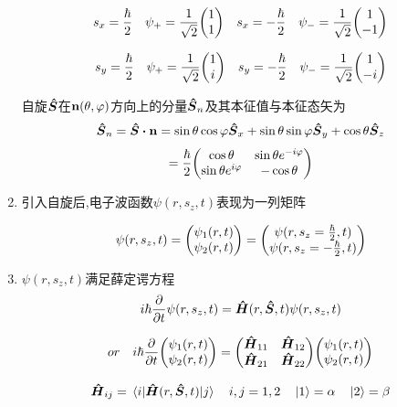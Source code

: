 \begin{formal}
\begin{enumerate}
                  $$ 
                  s_{x} = \frac{\hbar}{2} \quad \psi_{+} = \frac{1}{\sqrt{2}} \mqty(1 \\ 1) \quad 
                  s_{x} = -\frac{\hbar}{2} \quad \psi_{-} = \frac{1}{\sqrt{2}} \mqty(1 \\ -1)
                  $$

                  $$ 
                  s_{y} = \frac{\hbar}{2} \quad \psi_{+} = \frac{1}{\sqrt{2}} \mqty(1 \\ i) \quad 
                  s_{y} = -\frac{\hbar}{2} \quad \psi_{-} = \frac{1}{\sqrt{2}} \mqty(1 \\ -i)
                  $$

                  自旋$\vu*{S}$在$\vb{n}(\theta,\varphi)$方向上的分量$\vu*{S}_{n}$及其本征值与本征态矢为
                  $$ 
                  \vu*{S}_{n} = \vb{\vu*{S}} \vdot \vb{n} = 
                  \sin{\theta} \cos{\varphi} \vu*{S}_{x} + \sin{\theta}\sin{\varphi} \vu*{S}_{y} + \cos{\theta}\vu*{S}_{z}
                  $$
                  $$
                  = \frac{\hbar}{2} \mqty(\cos{\theta} & \sin{\theta}e^{-i\varphi} \\ \sin{\theta}e^{i\varphi} & -\cos{\theta}   )
                  $$

            \item 引入自旋后,电子波函数$\psi(r,s_{z},t)$表现为一列矩阵
            
                  $$ 
                  \psi(r,s_{z},t) = \mqty(\psi_{1}(r,t) \\ \psi_{2}(r,t) ) = 
                  \mqty(\psi(r,s_{z} = \frac{\hbar}{2},t) \\ \psi(r,s_{z} = -\frac{\hbar}{2},t) ) 
                  $$

            \item $\psi(r,s_{z},t)$满足薛定谔方程
                  $$ i\hbar\pdv{}{t} \psi(r,s_{z},t) = \vu*{H}(r,\vu*{S},t)\psi(r,s_{z},t) $$
                  
                  $$ 
                  or \quad i\hbar \pdv{t} \mqty(\psi_{1}(r,t) \\ \psi_{2}(r,t)) = 
                  \mqty(\vu*{H}_{11} & \vu*{H}_{12} \\ \vu*{H}_{21} & \vu*{H}_{22} ) \mqty(\psi_{1}(r,t) \\ \psi_{2}(r,t))
                  $$
                  
                  $$
                  \vu*{H}_{ij} = \mel{i}{\vu*{H}(r,\vu*{S},t)}{j} \quad i,j = 1,2 \quad \ket{1} = \alpha \quad \ket{2} = \beta
                  $$


\end{enumerate}
\end{formal}
